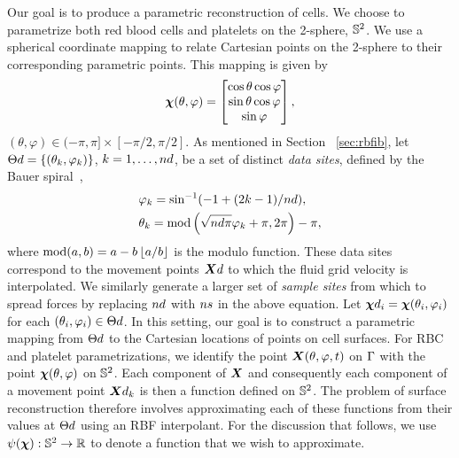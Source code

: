 Our goal is to produce a parametric reconstruction of cells. We choose to parametrize both red blood cells and
platelets on the 2-sphere, $\mathbb{S}^2$. We use a spherical coordinate mapping to relate Cartesian points on the
2-sphere to their corresponding parametric points. This mapping is given by
\begin{equation}
    \boldsymbol{\chi}(\theta, \varphi) =
    \begin{bmatrix}
        \cos\theta\cos\varphi \\
        \sin\theta\cos\varphi \\
        \sin\varphi
    \end{bmatrix},
\end{equation}
$(\theta, \varphi)\in(-\pi, \pi]\times[-\pi/2, \pi/2]$. As mentioned in Section~%
\ref{sec:rbfib}, let $\data\sites = \{(\theta_k, \varphi_k)\}$,
$k=1, \ldots, \data\cardinality$, be a set of distinct \emph{data sites}, defined by the
Bauer spiral~\cite{Bauer:2000km},
\begin{equation}\label{eq:bauer-spiral}
    \begin{aligned}
        &\varphi_k = \sin^{-1}(-1 + (2k - 1) / \data\cardinality),\\
        &\theta_k = \modulo\left(\sqrt{\data\cardinality\pi}\varphi_k + \pi, 2\pi\right) - \pi,
    \end{aligned}
\end{equation}
where $\operatorname{mod}(a, b) = a - b\left\lfloor{a/b}\right\rfloor$ is the modulo function. These data sites correspond to the movement points $\data\X$ to which the fluid grid velocity is interpolated. We similarly generate a larger set of
\emph{sample sites} from which to spread forces by replacing $\data\cardinality$ with $\sample\cardinality$ in the
above equation. Let $\data\Xp_i=\Xp(\theta_i, \varphi_i)$ for each $(\theta_i, \varphi_i)\in\data\sites$. In this
setting, our goal is to construct a parametric mapping from $\data\sites$ to the Cartesian locations of points on
cell surfaces. For RBC and platelet parametrizations, we identify the point $\boldsymbol{X}(\theta, \varphi, t)$ on
$\Gamma$ with the point $\boldsymbol{\chi}(\theta, \varphi)$ on $\mathbb{S}^2$. Each component of $\boldsymbol{X}$ and consequently each
component of a movement point $\data\X_k$ is then a function defined on $\mathbb{S}^2$. The problem of surface
reconstruction therefore involves approximating each of these functions from their values at $\data\sites$ using an RBF
interpolant. For the discussion that follows, we use $\psi(\boldsymbol{\chi}):\mathbb{S}^2\to\mathbb{R}$ to denote a function that we wish to
approximate.

